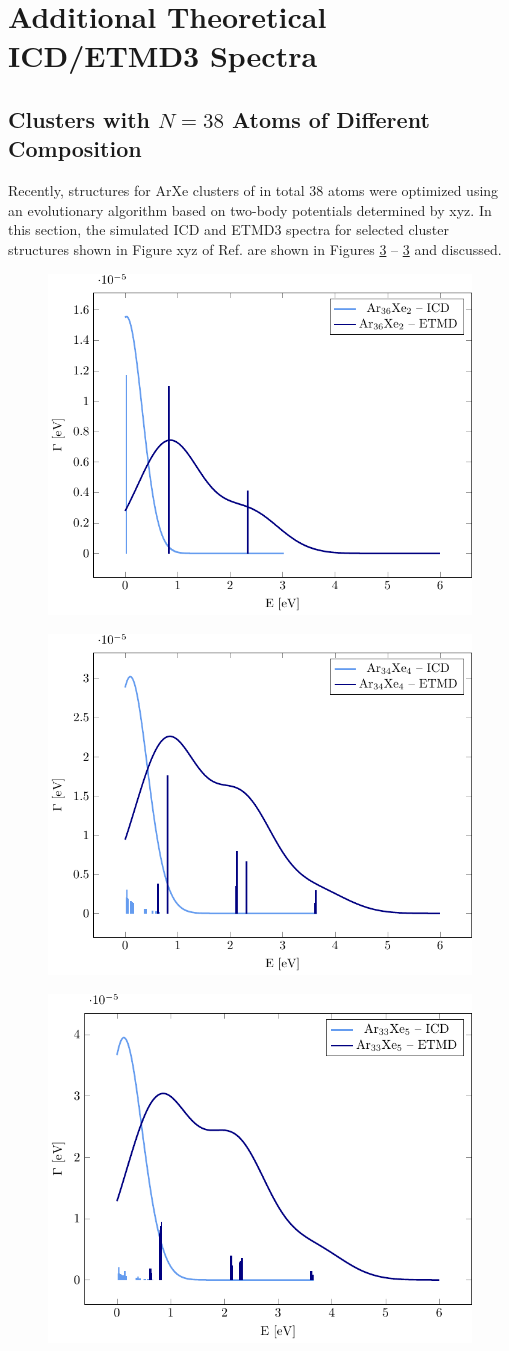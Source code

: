 \section{Additional Theoretical ICD/ETMD3 Spectra}

\subsection{Clusters with $N=38$ Atoms of Different Composition}
Recently, structures for ArXe clusters of in total 38 atoms were optimized
using an evolutionary algorithm based on two-body potentials determined
by xyz. \cite{}
In this section, the simulated ICD and ETMD3 spectra for selected cluster
structures shown in Figure xyz of Ref. \citenum{} are shown in Figures
\ref{} -- \ref{} and discussed.


\begin{figure}
 \centering
 \includegraphics[width=0.5\columnwidth]{pics/Ar36Xe2.pdf}
 \caption{}
 \label{}
\end{figure}


\begin{figure}
 \centering
 \includegraphics[width=0.5\columnwidth]{pics/Ar34Xe4.pdf}
 \caption{}
 \label{}
\end{figure}


\begin{figure}
 \centering
 \includegraphics[width=0.5\columnwidth]{pics/Ar33Xe5.pdf}
 \caption{}
 \label{}
\end{figure}

